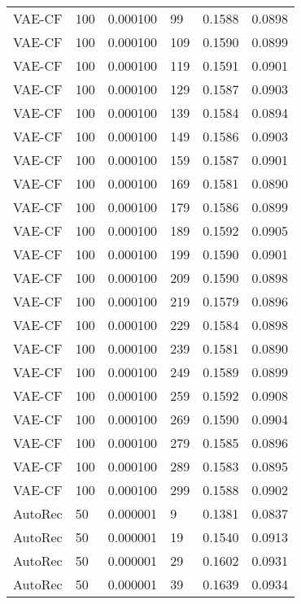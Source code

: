 \begin{tabular}{llrlrr}
  VAE-CF &  100 &  0.000100 &    99 &  0.1588 &       0.0898 \\
  VAE-CF &  100 &  0.000100 &   109 &  0.1590 &       0.0899 \\
  VAE-CF &  100 &  0.000100 &   119 &  0.1591 &       0.0901 \\
  VAE-CF &  100 &  0.000100 &   129 &  0.1587 &       0.0903 \\
  VAE-CF &  100 &  0.000100 &   139 &  0.1584 &       0.0894 \\
  VAE-CF &  100 &  0.000100 &   149 &  0.1586 &       0.0903 \\
  VAE-CF &  100 &  0.000100 &   159 &  0.1587 &       0.0901 \\
  VAE-CF &  100 &  0.000100 &   169 &  0.1581 &       0.0890 \\
  VAE-CF &  100 &  0.000100 &   179 &  0.1586 &       0.0899 \\
  VAE-CF &  100 &  0.000100 &   189 &  0.1592 &       0.0905 \\
  VAE-CF &  100 &  0.000100 &   199 &  0.1590 &       0.0901 \\
  VAE-CF &  100 &  0.000100 &   209 &  0.1590 &       0.0898 \\
  VAE-CF &  100 &  0.000100 &   219 &  0.1579 &       0.0896 \\
  VAE-CF &  100 &  0.000100 &   229 &  0.1584 &       0.0898 \\
  VAE-CF &  100 &  0.000100 &   239 &  0.1581 &       0.0890 \\
  VAE-CF &  100 &  0.000100 &   249 &  0.1589 &       0.0899 \\
  VAE-CF &  100 &  0.000100 &   259 &  0.1592 &       0.0908 \\
  VAE-CF &  100 &  0.000100 &   269 &  0.1590 &       0.0904 \\
  VAE-CF &  100 &  0.000100 &   279 &  0.1585 &       0.0896 \\
  VAE-CF &  100 &  0.000100 &   289 &  0.1583 &       0.0895 \\
  VAE-CF &  100 &  0.000100 &   299 &  0.1588 &       0.0902 \\
 AutoRec &   50 &  0.000001 &     9 &  0.1381 &       0.0837 \\
 AutoRec &   50 &  0.000001 &    19 &  0.1540 &       0.0913 \\
 AutoRec &   50 &  0.000001 &    29 &  0.1602 &       0.0931 \\
 AutoRec &   50 &  0.000001 &    39 &  0.1639 &       0.0934 \\

\end{tabular}
